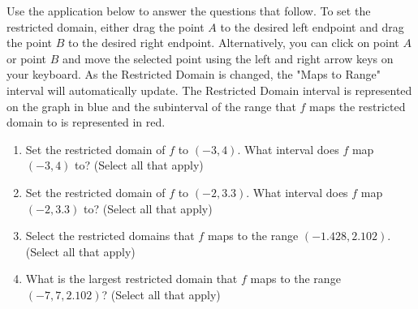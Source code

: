\documentclass{ximera}
\author{Kevin James}
\begin{document}
   \begin{exercise}
   	  Use the application below to answer the questions that follow.  To set the restricted domain, either drag the point $ A $ to the desired left endpoint and drag the point $ B $ to the desired right endpoint.  Alternatively, you can click on point $ A $ or point $ B $ and move the selected point using the left and right arrow keys on your keyboard.  As the Restricted Domain is changed, the "Maps to Range" interval will automatically update.  The Restricted Domain interval is represented on the graph in blue and the subinterval of the range that $ f $ maps the restricted domain to is represented in red.
   	  \begin{center}
   	  	\begin{onlineOnly}
   	    \end{onlineOnly} 
     \end{center}
 	 \begin{enumerate}
 	 	\item Set the restricted domain of $ f $ to $ (-3, 4) $.  What interval does $ f $ map $ (-3, 4) $ to?  (Select all that apply)
   	       \begin{multipleChoice}
   	       \end{multipleChoice}
        \item Set the restricted domain of $ f $ to $ (-2, 3.3) $.  What interval does $ f $ map $ (-2,3.3) $ to?  (Select all that apply)
           \begin{selectAll}
          \end{selectAll}
        \item Select the restricted domains that $ f $ maps to the range $ (-1.428, 2.102) $.  (Select all that apply)
          \begin{selectAll}
          \end{selectAll}
        \item What is the largest restricted domain that $ f $ maps to the range $ (-7,7, 2.102) $?  (Select all that apply)

\end{enumerate}
\end{exercise}
\end{document}
